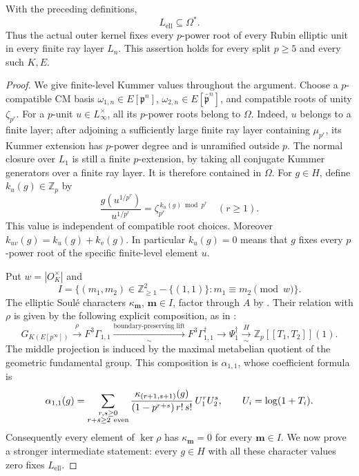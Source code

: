 \begin{proposition}\label{prop:cm-full-radical}
With the preceding definitions,
\[
             L_{\mathrm{ell}}\subseteq\Omega^*.
\]
Thus the actual outer kernel fixes every \(p\)-power root of every
Rubin elliptic unit in every finite ray layer \(L_n\).
This assertion holds for every split \(p\geq5\) and every such \(K,E\).
\end{proposition}

\begin{proof}
We give finite-level Kummer values throughout the argument.
Choose a \(p\)-compatible CM basis
\(\omega_{1,n}\in E[\mathfrak p^n]\),
\(\omega_{2,n}\in E[\bar{\mathfrak p}^n]\), and compatible
roots of unity \(\zeta_{p^r}\).
For a \(p\)-unit \(u\in L_\infty^\times\), all its \(p\)-power roots
belong to \(\Omega\).
Indeed, \(u\) belongs to a finite layer; after adjoining a sufficiently
large finite ray layer containing \(\mu_{p^r}\), its Kummer extension
has \(p\)-power degree and is unramified outside \(p\).
The normal closure over \(L_1\) is still a finite \(p\)-extension,
by taking all conjugate Kummer generators over a finite ray layer.
It is therefore contained in \(\Omega\).
For \(g\in H\), define \(k_u(g)\in\mathbb Z_p\) by
\[
 \frac{g(u^{1/p^r})}{u^{1/p^r}}
             =\zeta_{p^r}^{\,k_u(g)\bmod p^r}\quad(r\geq1).
\]
This value is independent of compatible root choices.
Moreover \(k_{uv}(g)=k_u(g)+k_v(g)\).
In particular \(k_u(g)=0\) means that \(g\) fixes every
\(p\)-power root of the specific finite-level element \(u\).

Put \(w=|O_K^\times|\) and
\[
 I=\{(m_1,m_2)\in\mathbb Z_{\geq1}^2-\{(1,1)\}:
                      m_1\equiv m_2\pmod w\}.
\]
The elliptic Soul\'e characters \(\kappa_{\boldsymbol m}\),
\(\boldsymbol m\in I\), factor through \(A\)
by \cite[Lemma 4.1, p.~16]{IshiiSoule}.
Their relation with \(\rho\) is given by the following explicit
composition, as in
\cite[Definition 2.5 and Theorem 2.6, p.~8]{Ishii}:
\[
 G_{K(E[p^\infty])}
 \xrightarrow{\rho}F^3\Gamma_{1,1}
 \xrightarrow[\sim]{\text{boundary-preserving lift}}
 F^3\Gamma_{1,1}^{\dagger}
 \longrightarrow\Psi_1^\dagger
 \xrightarrow[\sim]{H}
       \mathbb Z_p[[T_1,T_2]](1).
\]
The middle projection is induced by the maximal metabelian quotient
of the geometric fundamental group.
This composition is \(\alpha_{1,1}\), whose coefficient formula is
\begin{equation}\label{eq:cm-radical-geometric-moments}
 \alpha_{1,1}(g)=
 \sum_{\substack{r,s\geq0\\ r+s\geq2\ {\rm even}}}
 \frac{\kappa_{(r+1,s+1)}(g)}
      {(1-p^{r+s})\,r!\,s!}\,U_1^rU_2^s,\qquad
 U_i=\log(1+T_i).
\end{equation}
Consequently every element of \(\ker\rho\) has
\(\kappa_{\boldsymbol m}=0\) for every \(\boldsymbol m\in I\).
We now prove a stronger intermediate statement: every \(g\in H\)
with all these character values zero fixes \(L_{\mathrm{ell}}\).


\end{proof}
